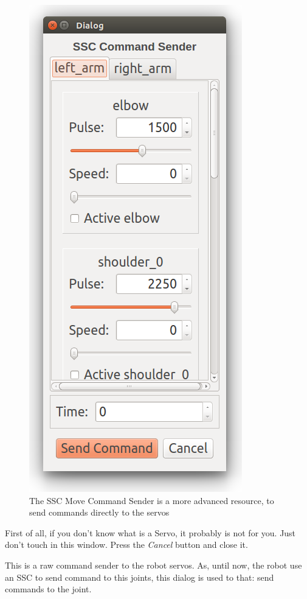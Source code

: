 \documentclass[oneside,a4paper,titlepage]{article}
\begin{document}
\begin{figure}[ht!]
	\centering
	\includegraphics[height=0.5\textheight]{ssc}
	\caption[SSC Move Command Sender]{The SSC Move Command Sender is a more advanced resource, to send commands directly to the servos}
	\label{fig:ssc}
\end{figure}

First of all, if you don't know what is a Servo, it probably is not for you. Just don't touch in this window. Press the \emph{Cancel} button and close it.

This is a raw command sender to the robot servos. As, until now, the robot use an SSC to send command to this joints, this dialog is used to that: send commands to the joint.
\end{document}
